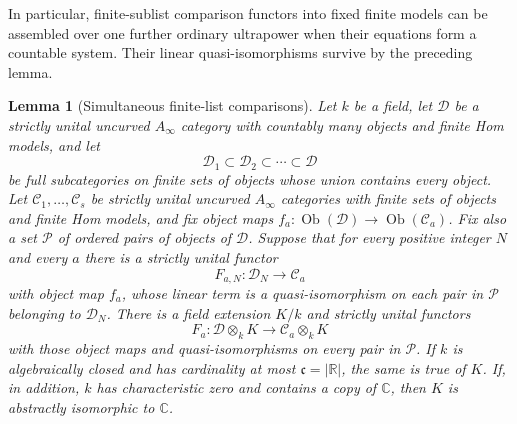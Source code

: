 \documentclass[11pt]{article}
\numberwithin{equation}{section}
\newtheorem{lemma}[theorem]{Lemma}
\theoremstyle{definition}
\theoremstyle{remark}
\newcommand{\C}{\mathbb C}
\newcommand{\R}{\mathbb R}
\begin{document}
In particular, finite-sublist comparison functors into fixed finite
models can be assembled over one further ordinary ultrapower when
their equations form a countable system.  Their linear
quasi-isomorphisms survive by the preceding lemma.

\begin{lemma}[Simultaneous finite-list comparisons]
\label{lem:finite-list-ultrapower}
Let $k$ be a field, let $\mathcal D$ be a strictly unital uncurved
$A_\infty$ category with countably many objects and finite Hom models,
and let
\[
 \mathcal D_1\subset\mathcal D_2\subset\cdots\subset\mathcal D
\]
be full subcategories on finite sets of objects whose union contains
every object.  Let $\mathcal C_1,\ldots,\mathcal C_s$ be strictly unital
uncurved $A_\infty$ categories with finite sets of objects and finite Hom
models, and fix object maps
$f_a:\operatorname{Ob}(\mathcal D)\to\operatorname{Ob}(\mathcal C_a)$.
Fix also a set $\mathcal P$ of ordered pairs of objects of $\mathcal D$.
Suppose that for every positive integer $N$ and every $a$ there is a
strictly unital functor
\[
 F_{a,N}:\mathcal D_N\longrightarrow\mathcal C_a
\]
with object map $f_a$, whose linear term is a quasi-isomorphism on each
pair in $\mathcal P$ belonging to $\mathcal D_N$.
There is a field extension $K/k$ and strictly unital functors
\[
 F_a:\mathcal D\otimes_k K\longrightarrow\mathcal C_a\otimes_k K
\]
with those object maps and quasi-isomorphisms on every pair in
$\mathcal P$.
If $k$ is algebraically closed and has cardinality at most
$\mathfrak c=|\R|$, the same is true of $K$.  If, in addition, $k$ has
characteristic zero and contains a copy of $\C$, then $K$ is abstractly
isomorphic to $\C$.
\end{lemma}
\end{document}
